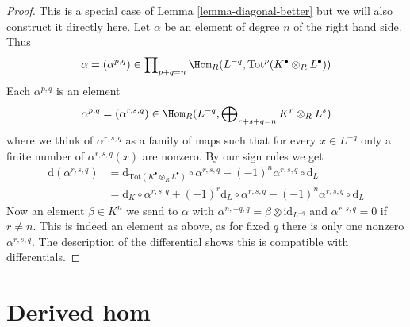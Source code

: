 \begin{proof}
This is a special case of Lemma \ref{lemma-diagonal-better}
but we will also construct it directly here.
Let $\alpha$ be an element of degree $n$ of the right hand side.
Thus
$$
\alpha = (\alpha^{p, q}) \in \prod\nolimits_{p + q = n}
\Hom_R(L^{-q}, \text{Tot}^p(K^\bullet \otimes_R L^\bullet))
$$
Each $\alpha^{p, q}$ is an element
$$
\alpha^{p, q} = (\alpha^{r, s, q}) \in
\Hom_R(L^{-q}, \bigoplus\nolimits_{r + s + q = n} K^r \otimes_R L^s)
$$
where we think of $\alpha^{r, s, q}$ as a family of maps such that
for every $x \in L^{-q}$ only a finite number of
$\alpha^{r, s, q}(x)$ are nonzero. By our sign rules we get
\begin{align*}
\text{d}(\alpha^{r, s, q})
& =
\text{d}_{\text{Tot}(K^\bullet \otimes_R L^\bullet)} \circ \alpha^{r, s, q}
- (-1)^n \alpha^{r, s, q} \circ \text{d}_L \\
& =
\text{d}_K \circ \alpha^{r, s, q} + (-1)^r \text{d}_L \circ \alpha^{r, s, q}
- (-1)^n \alpha^{r, s, q} \circ \text{d}_L
\end{align*}
Now an element $\beta \in K^n$ we send to $\alpha$ with
$\alpha^{n, -q, q} = \beta \otimes \text{id}_{L^{-q}}$
and $\alpha^{r, s, q} = 0$ if $r \not = n$. This is indeed
an element as above, as for fixed $q$ there is only one nonzero
$\alpha^{r, s, q}$. The description of
the differential shows this is compatible with differentials.
\end{proof}




\section{Derived hom}
\label{section-RHom}

